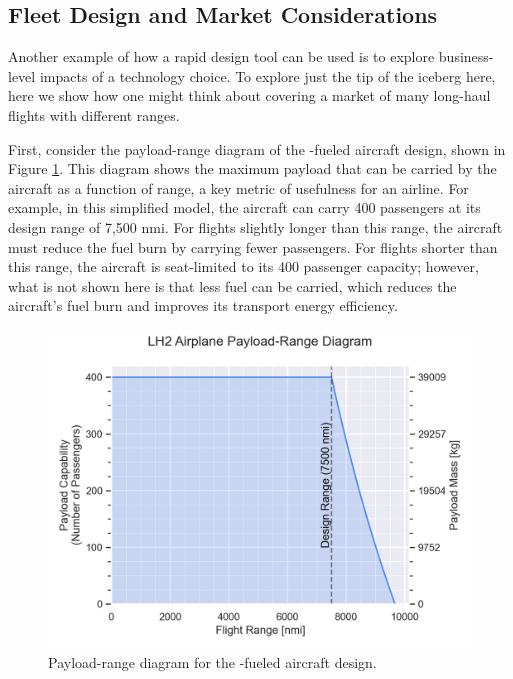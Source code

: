 \subsection{Fleet Design and Market Considerations}

Another example of how a rapid design tool can be used is to explore business-level impacts of a technology choice. To explore just the tip of the iceberg here, here we show how one might think about covering a market of many long-haul flights with different ranges.

First, consider the payload-range diagram of the \lh-fueled aircraft design, shown in Figure \ref{fig:h2_payload_range}. This diagram shows the maximum payload that can be carried by the aircraft as a function of range, a key metric of usefulness for an airline. For example, in this simplified model, the aircraft can carry 400 passengers at its design range of 7,500 nmi. For flights slightly longer than this range, the aircraft must reduce the fuel burn by carrying fewer passengers. For flights shorter than this range, the aircraft is seat-limited to its 400 passenger capacity; however, what is not shown here is that less fuel can be carried, which reduces the aircraft's fuel burn and improves its transport energy efficiency.

\begin{figure}[h]
    \centering
    \includegraphics[width=5in]{../figures/Hydrogen/ppt/media/image30.png}
    \caption{Payload-range diagram for the \lh-fueled aircraft design.}
    \label{fig:h2_payload_range}
\end{figure}

